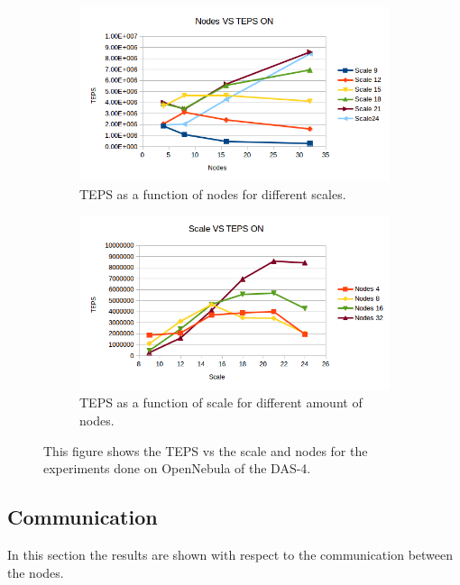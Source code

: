\begin{figure}[!h]
\centering
\begin{subfigure}{.5\textwidth}
  \centering
  \includegraphics[width=\linewidth]{images/nodes_opennebula.png}
  \caption{TEPS as a function of nodes for different scales.}
  \label{fig:nodes_opennebula}
\end{subfigure}%
\begin{subfigure}{.5\textwidth}
  \centering
  \includegraphics[width=\linewidth]{images/scale_opennebula.png}
  \caption{TEPS as a function of scale for different amount of nodes.}
  \label{fig:scale_opennebula}
\end{subfigure}
\caption{This figure shows the TEPS vs the scale and nodes for the experiments done on OpenNebula of the DAS-4.}
\label{fig:das_opennebula}
\end{figure}

\subsection{Communication}
In this section the results are shown with respect to the communication between the nodes.
